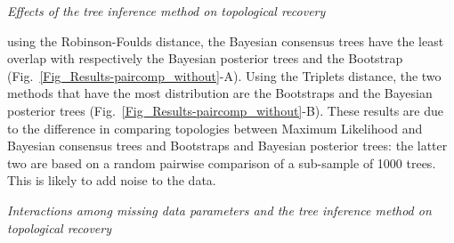 \documentclass[12pt,letterpaper]{article}
\renewcommand{\subsection}[1]{%
\bigskip
\begin{center}
\begin{large}
\normalfont\itshape #1
\end{large}
\end{center}}
\begin{document}
\subsection{Effects of the tree inference method on topological recovery}



using the Robinson-Foulds distance, the Bayesian consensus trees have the least overlap with respectively the Bayesian posterior trees and the Bootstrap (Fig.~\ref{Fig_Results-paircomp_without}-A). Using the Triplets distance, the two methods that have the most distribution %
are the Bootstraps and the Bayesian posterior trees (Fig.~\ref{Fig_Results-paircomp_without}-B). These results are due to the difference in comparing topologies between Maximum Likelihood and Bayesian consensus trees and Bootstraps and Bayesian posterior trees: the latter two are based on a random pairwise comparison of a sub-sample of 1000 trees. This is likely to add noise to the data.

\subsection{Interactions among missing data parameters and the tree inference method on topological recovery}

\end{document}
